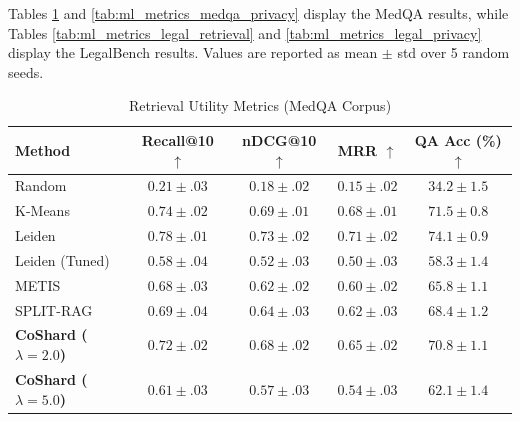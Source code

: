 Tables \ref{tab:ml_metrics_medqa_retrieval} and \ref{tab:ml_metrics_medqa_privacy} display the MedQA results, while Tables \ref{tab:ml_metrics_legal_retrieval} and \ref{tab:ml_metrics_legal_privacy} display the LegalBench results. Values are reported as mean $\pm$ std over 5 random seeds.

\begin{table}[htbp]
\centering
\caption{Retrieval Utility Metrics (MedQA Corpus)}
\label{tab:ml_metrics_medqa_retrieval}
\begin{tabular}{l | c c c c}
\hline
\textbf{Method} & \textbf{Recall@10} $\uparrow$ & \textbf{nDCG@10} $\uparrow$ & \textbf{MRR} $\uparrow$ & \textbf{QA Acc (\%)} $\uparrow$ \\
\hline
Random & $0.21 \pm .03$ & $0.18 \pm .02$ & $0.15 \pm .02$ & $34.2 \pm 1.5$ \\
K-Means & $0.74 \pm .02$ & $0.69 \pm .01$ & $0.68 \pm .01$ & $71.5 \pm 0.8$ \\
Leiden & $\mathbf{0.78 \pm .01}$ & $\mathbf{0.73 \pm .02}$ & $\mathbf{0.71 \pm .02}$ & $\mathbf{74.1 \pm 0.9}$ \\
Leiden (Tuned) & $0.58 \pm .04$ & $0.52 \pm .03$ & $0.50 \pm .03$ & $58.3 \pm 1.4$ \\
METIS & $0.68 \pm .03$ & $0.62 \pm .02$ & $0.60 \pm .02$ & $65.8 \pm 1.1$ \\
SPLIT-RAG & $0.69 \pm .04$ & $0.64 \pm .03$ & $0.62 \pm .03$ & $68.4 \pm 1.2$ \\
\hline
\textbf{CoShard ($\lambda=2.0$)} & $0.72 \pm .02$ & $0.68 \pm .02$ & $0.65 \pm .02$ & $70.8 \pm 1.1$ \\
\textbf{CoShard ($\lambda=5.0$)} & $0.61 \pm .03$ & $0.57 \pm .03$ & $0.54 \pm .03$ & $62.1 \pm 1.4$ \\
\hline
\end{tabular}
\end{table}

